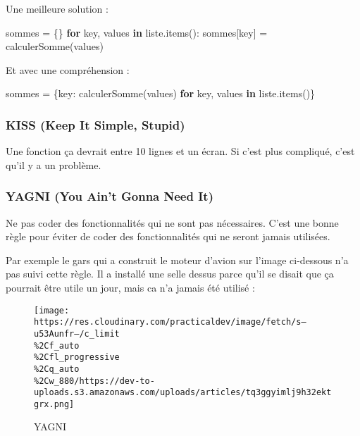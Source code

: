 \documentclass[11pt]{article}
\newenvironment{Shaded}{}{}
\newcommand{\KeywordTok}[1]{\textcolor[rgb]{0.00,0.44,0.13}{\textbf{{#1}}}}
\newcommand{\NormalTok}[1]{{#1}}
\newcommand{\ControlFlowTok}[1]{\textcolor[rgb]{0.00,0.44,0.13}{\textbf{{#1}}}}
\newcommand{\OperatorTok}[1]{\textcolor[rgb]{0.40,0.40,0.40}{{#1}}}
\begin{document}
Une meilleure solution :

\begin{Shaded}
\begin{Highlighting}[]
\NormalTok{sommes }\OperatorTok{=}\NormalTok{ \{\}}
\ControlFlowTok{for}\NormalTok{ key, values }\KeywordTok{in}\NormalTok{ liste.items():}
\NormalTok{    sommes[key] }\OperatorTok{=}\NormalTok{ calculerSomme(values)}
\end{Highlighting}
\end{Shaded}

Et avec une compréhension :

\begin{Shaded}
\begin{Highlighting}[]
\NormalTok{sommes }\OperatorTok{=}\NormalTok{ \{key: calculerSomme(values) }\ControlFlowTok{for}\NormalTok{ key, values }\KeywordTok{in}\NormalTok{ liste.items()\}}
\end{Highlighting}
\end{Shaded}

\hypertarget{kiss-keep-it-simple-stupid}{%
\subsubsection{KISS (Keep It Simple,
Stupid)}\label{kiss-keep-it-simple-stupid}}

Une fonction ça devrait entre 10 lignes et un écran. Si c'est plus
compliqué, c'est qu'il y a un problème.

\hypertarget{yagni-you-aint-gonna-need-it}{%
\subsubsection{YAGNI (You Ain't Gonna Need
It)}\label{yagni-you-aint-gonna-need-it}}

Ne pas coder des fonctionnalités qui ne sont pas nécessaires. C'est une
bonne règle pour éviter de coder des fonctionnalités qui ne seront
jamais utilisées.

Par exemple le gars qui a construit le moteur d'avion sur l'image
ci-dessous n'a pas suivi cette règle. Il a installé une selle dessus
parce qu'il se disait que ça pourrait être utile un jour, mais ca n'a
jamais été utilisé :

\begin{figure}
\centering
\texttt{[image: https://res.cloudinary.com/practicaldev/image/fetch/s--u53Aunfr--/c\_limit\\\%2Cf\_auto\\\%2Cfl\_progressive\\\%2Cq\_auto\\\%2Cw\_880/https://dev-to-uploads.s3.amazonaws.com/uploads/articles/tq3ggyimlj9h32ektgrx.png]}
\caption{YAGNI}
\end{figure}
\end{document}
